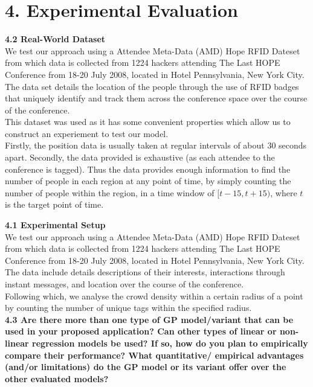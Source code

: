 \documentclass[letterpaper]{article}
\begin{document}
\section{4.  Experimental Evaluation}

{\bf4.2  Real-World Dataset} \\

We test our approach using a Attendee Meta-Data (AMD) Hope RFID Dateset from which data is collected from 1224 hackers attending The Last HOPE Conference from 18-20 July 2008, located in Hotel Pennsylvania, New York City. The data set details the location of the people through the use of RFID badges that uniquely identify and track them across the conference space over the course of the conference. \\

This dataset was used as it has some convenient properties which allow us to construct an experiement to test our model.\\
Firstly, the position data is usually taken at regular intervals of about $30$ seconds apart. Secondly, the data provided is exhaustive (as each attendee to the conference is tagged). Thus the data provides enough information to find the number of people in each region at any point of time, by simply counting the number of people within the region, in a time window of $[t-15,t+15)$, where $t$ is the target point of time.

{\bf4.1  Experimental Setup} \\

We test our approach using a Attendee Meta-Data (AMD) Hope RFID Dateset from which data is collected from 1224 hackers attending The Last HOPE Conference from 18-20 July 2008, located in Hotel Pennsylvania, New York City. The data include details descriptions of their interests, interactions through instant messages, and location over the course of the conference.\\

Following which, we analyse the crowd density within a certain radius of a point by counting the number of unique tags within the specified radius. \\  

{\bf4.3  Are there more than one type of GP model/variant that can be used in your proposed application? Can other types of linear or non-linear regression models be used? If so, how do you plan to empirically compare their performance? What quantitative/ empirical advantages (and/or limitations) do the GP model or its variant offer over the other evaluated models?} \\
\end{document}
